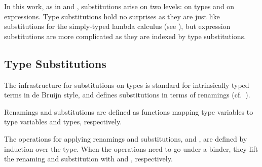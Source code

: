\documentclass[sigplan,anonymous,review,screen]{acmart}
\newenvironment{AgdaBlock}{%
  \vspace{\AgdaEmptySkip}%
  \AgdaNoSpaceAroundCode{}%
}{%
  \AgdaSpaceAroundCode{}
  \vspace{-\AgdaEmptySkip}
}
\begin{document}
In this work, as in \citet{DBLP:journals/jar/BentonHKM12} and
\citet{DBLP:conf/mpc/ChapmanKNW19}, substitutions arise on two levels:
on types and on expressions. Type substitutions hold no surprises as
they are just like substitutions for the simply-typed lambda calculus (see
\cite{DBLP:journals/scp/KokkeSW20}), but expression substitutions are
more complicated as they are indexed by type substitutions.

\subsection{Type Substitutions}
\label{sec:substitutions:type}

The infrastructure for substitutions on types is standard for
intrinsically typed terms in de Bruijn
style, and defines substitutions in terms of renamings
(cf.~\cite{DBLP:journals/jar/BentonHKM12, DBLP:conf/mpc/ChapmanKNW19, DBLP:journals/scp/KokkeSW20}).



Renamings {\ATRen} and substitutions {\ATSub} are defined as
functions mapping type variables to type variables and types, respectively.
\begin{AgdaBlock}
  \SubDefTRen
  \vspace{-2.5mm}
  \SubDefTSub
\end{AgdaBlock}

The operations for applying renamings and substitutions, {\ATren}
and {\ATsub}, are defined by induction over the type. When the
operations need to go under a binder, they lift the renaming and
substitution with {\ATliftR} and {\ATliftS}, respectively.
\end{document}
